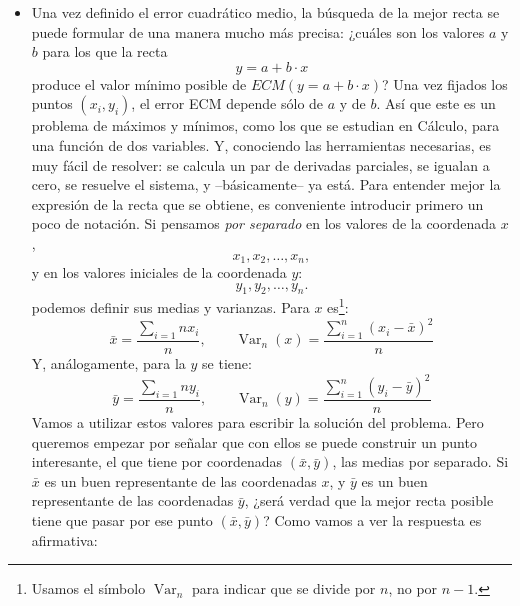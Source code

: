 \begin{itemize}
    \item Una vez definido el error cuadrático medio, la búsqueda de la mejor recta se puede formular de una manera mucho más precisa: ¿cuáles son los valores $a$ y $b$ para los que la recta
    \[y=a+b\cdot x\]
    produce el valor mínimo posible de $ECM(y=a+b\cdot x)$? Una vez fijados los puntos $(x_i,y_i)$, el error ECM depende sólo de $a$ y de $b$. Así que este es un problema de máximos y mínimos, como los que se estudian en Cálculo, para una función de dos variables. Y, conociendo las herramientas necesarias, es muy fácil de resolver: se calcula un par de derivadas parciales, se igualan a cero, se resuelve el sistema, y --básicamente-- ya está. Para entender mejor la expresión de la recta que se obtiene, es conveniente introducir primero un poco de notación. Si pensamos {\em por separado} en los valores de la coordenada $x$,
    \[x_1, x_2,\ldots, x_n,\]
    y en los valores iniciales de la coordenada $y$:
    \[y_1, y_2,\ldots, y_n.\]
    podemos definir sus medias y varianzas. Para $x$ es\footnote{Usamos el símbolo $\operatorname{Var}_n$ para indicar que se divide por $n$, no por $n-1$.}:
    \[\bar x=\dfrac{\displaystyle\sum_{i=1}{n}x_i}{n},\qquad {\operatorname{Var}_n}(x)=\dfrac{\displaystyle\sum_{i=1}^{n}(x_i-\bar x)^2}{n}\]
    Y, análogamente, para la $y$ se tiene:
    \[\bar y=\dfrac{\displaystyle\sum_{i=1}{n}y_i}{n},\qquad {\operatorname{Var}_n}(y)=\dfrac{\displaystyle\sum_{i=1}^{n}(y_i-\bar y)^2}{n}\]
    Vamos a utilizar estos valores para escribir la solución del problema. Pero queremos empezar por señalar que con ellos se puede construir un punto interesante, el que tiene por coordenadas $(\bar x,\bar y)$, las medias por separado. Si $\bar x$ es un buen representante de las coordenadas $x$, y $\bar y$ es un buen representante de las coordenadas $\bar y$, ¿será verdad que la mejor recta posible tiene que pasar por ese punto $(\bar x,\bar y)$? Como vamos a ver la respuesta es afirmativa:\\[3mm]
\end{itemize}
